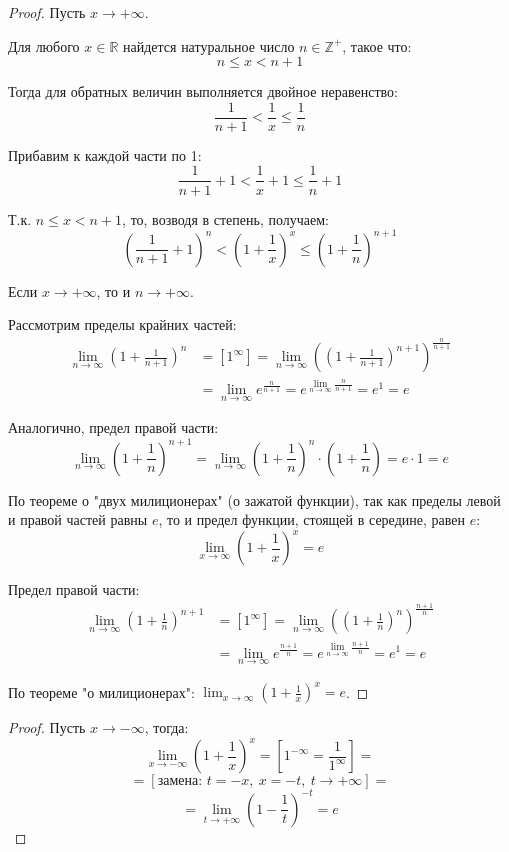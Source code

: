 \documentclass[12pt, a4paper]{article}
\theoremstyle{remark}
\newcommand{\R}{\mathbb{R}}
\newcommand{\Z}{\mathbb{Z}}
\begin{document}
	\begin{proof}
		Пусть \(x \to +\infty\). 
		
		Для любого \(x \in \R\) найдется натуральное число \(n \in \Z^+\), такое что:
		\[
		n \leq x < n + 1
		\]
		
		Тогда для обратных величин выполняется двойное неравенство:
		\[
		\frac{1}{n+1} < \frac{1}{x} \leq \frac{1}{n}
		\]
		
		Прибавим к каждой части по 1:
		\[
		\frac{1}{n+1} + 1 < \frac{1}{x} + 1 \leq \frac{1}{n} + 1
		\]
		
		Т.к. \(n \leq x < n + 1\), то, возводя в степень, получаем:
		\[
		\left(\frac{1}{n+1} + 1\right)^{n} < \left(1 + \frac{1}{x}\right)^x \leq \left(1 + \frac{1}{n}\right)^{n+1}
		\]
		
		Если \(x \to +\infty\), то и \(n \to +\infty\). 
		
		Рассмотрим пределы крайних частей:
		\begin{align*}
			\lim_{n \to \infty} \left(1 + \frac{1}{n+1}\right)^n &= \left[ 1^\infty \right] = \lim_{n \to \infty} \left( \left(1 + \frac{1}{n+1}\right)^{n+1} \right)^{\frac{n}{n+1}} \\
			&= \lim_{n \to \infty} e^{\frac{n}{n+1}} = e^{\displaystyle \lim_{n \to \infty} \frac{n}{n+1}} = e^1 = e
		\end{align*}
		
		Аналогично, предел правой части:
		\[
		\lim_{n \to \infty} \left(1 + \frac{1}{n}\right)^{n+1} = \lim_{n \to \infty} \left(1 + \frac{1}{n}\right)^n \cdot \left(1 + \frac{1}{n}\right) = e \cdot 1 = e
		\]
		
		По теореме о "двух милиционерах" (о зажатой функции), так как пределы левой и правой частей равны \(e\), то и предел функции, стоящей в середине, равен \(e\):
		\[
		\lim_{x \to \infty} \left(1 + \frac{1}{x}\right)^x = e
		\]
		
		Предел правой части:
		\begin{align*}
			\lim_{n \to \infty} \left(1 + \frac{1}{n}\right)^{n+1} &= \left[ 1^\infty \right] = \lim_{n \to \infty} \left( \left(1 + \frac{1}{n}\right)^n \right)^{\frac{n+1}{n}} \\
			&= \lim_{n \to \infty} e^{\frac{n+1}{n}} = e^{\displaystyle \lim_{n \to \infty} \frac{n+1}{n}} = e^1 = e
		\end{align*}
		
		По теореме "о милиционерах": \(\lim_{x \to \infty} \left(1 + \frac{1}{x}\right)^x = e\).
		
	\end{proof}
	\begin{proof}
		Пусть \(x \to -\infty\), тогда:
		\[
		\lim_{x \to -\infty} \left(1 + \frac{1}{x}\right)^x = \left[ 1^{-\infty} = \frac{1}{1^\infty} \right] = 
		\]
		\[
		= \left[ \text{замена: } t = -x, \ x = -t, \ t \to +\infty \right] = 
		\]
		\[
		= \lim_{t \to +\infty} \left(1 - \frac{1}{t}\right)^{-t} = e
		\]
		
	\end{proof}
	
\end{document}
